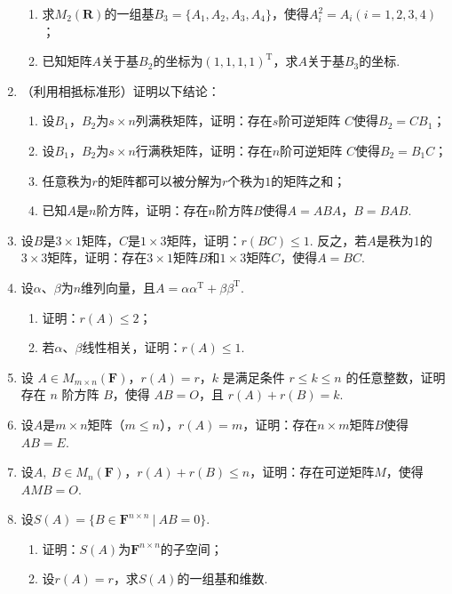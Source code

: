 \begin{enumerate}
\begin{enumerate}[label=(\arabic*)]
        \item 求$M_2(\mathbf{R})$的一组基$B_3=\{A_1,A_2,A_3,A_4\}$，使得$A_i^2=A_i(i=1,2,3,4)$；
        \item 已知矩阵$A$关于基$B_2$的坐标为$(1,1,1,1)^\mathrm{T}$，求$A$关于基$B_3$的坐标.
    \end{enumerate}
    \item （利用相抵标准形）证明以下结论：
	\begin{enumerate}[label=(\arabic*)]
        \item 设$B_1$，$B_2$为$s \times n$列满秩矩阵，证明：存在$s$阶可逆矩阵
        $C$使得$B_2=CB_1$；
        \item 设$B_1$，$B_2$为$s \times n$行满秩矩阵，证明：存在$n$阶可逆矩阵
        $C$使得$B_2=B_1C$；
        \item 任意秩为$r$的矩阵都可以被分解为$r$个秩为$1$的矩阵之和；
        \item 已知$A$是$n$阶方阵，证明：存在$n$阶方阵$B$使得$A=ABA$，$B=BAB$.
    \end{enumerate}
	\item 设$B$是$3 \times 1$矩阵，$C$是$1 \times 3$矩阵，证明：$r(BC) \le 1$.
	反之，若$A$是秩为1的$3 \times 3$矩阵，证明：存在$3 \times 1$矩阵$B$和$1 \times 3$矩阵$C$，使得$A = BC$.
	\item 设$\alpha$、$\beta$为$n$维列向量，且$A=\alpha\alpha^\mathrm{T}+\beta\beta^\mathrm{T}$.
	\begin{enumerate}
        \item 证明：$r(A) \le 2$；
        \item 若$\alpha$、$\beta$线性相关，证明：$r(A) \le 1$.
    \end{enumerate}
	\item 设 $A \in M_{m \times n}(\mathbf{F})$，$r(A)=r$，$k$ 是满足条件 $r \leq k \leq n$ 的任意整数，证明存在 $n$ 阶方阵 $B$，使得 $AB=O$，且 $r(A)+r(B)=k$.
	\item 设$A$是$m \times n$矩阵（$m \le n$），$r(A)=m$，证明：存在$n \times m$矩阵$B$使得$AB=E$.
	\item 设$A,\ B \in M_n(\mathbf{F})$，$r(A)+r(B) \le n$，证明：存在可逆矩阵$M$，使得$AMB=O$.
	\item 设$S(A)=\{B \in \mathbf{F}^{n\times n}\ |\ AB=0\}$.
	\begin{enumerate}[label=(\arabic*)]
        \item 证明：$S(A)$为$\mathbf{F}^{n\times n}$的子空间；
        \item 设$r(A)=r$，求$S(A)$的一组基和维数.
    \end{enumerate}
\end{enumerate}
